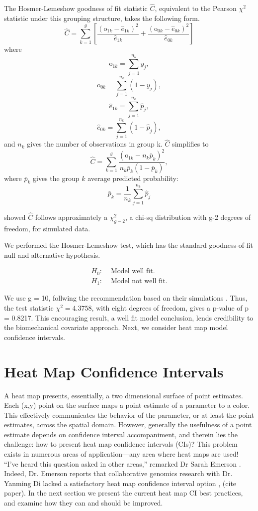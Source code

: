 The Hosmer-Lemeshow goodness of fit statistic $\hat{C}$, equivalent to the Pearson $\chi^{2}$ statistic under this grouping structure, takes the following form.
$$ \widehat{C} = \sum_{k=1}^{g} \left[ \frac{(\text{o}_{1k}-\hat{e}_{1k})^{2}}{\hat{e}_{1k}} + \frac{(\text{o}_{0k}-\hat{e}_{0k})^{2}}{\hat{e}_{0k}}  \right] $$
where
$$ \text{o}_{1k} =  \sum_{j=1}^{n_{k}}y_{j},$$
$$ \text{o}_{0k} =  \sum_{j=1}^{n_{k}}(1-y_{j}),$$
$$ \hat{e}_{1k} = \sum_{j=1}^{n_{k}}\hat{p}_{j},$$
$$ \hat{e}_{0k} = \sum_{j=1}^{n_{k}}(1-\hat{p}_{j}),$$
and $n_{k}$ gives the number of observations in group k. $\widehat{C}$ simplifies to
$$ \widehat{C} = \sum_{k=1}^{g} \frac{(\text{o}_{1k}-n_{k}\bar{p}_{k})^{2}}{n_{k}\bar{p}_{k}(1-\bar{p}_{k})},$$
where $\bar{p}_{k}$ gives the group $k$ average predicted probability:
$$\bar{p}_{k} = \frac{1}{n_{k}}\sum_{j=1}^{n_{k}}\hat{p}_{j}$$

\cite{Hosmer1980} showed $\widehat{C}$ follows approximately a $\chi^{2}_{g-2}$, a chi-sq distribution with g-2 degrees of freedom, for simulated data. 

We performed the Hosmer-Lemeshow test, which has the standard goodness-of-fit null and alternative hypothesis.

\begin{align}
H_{0}: & \text{ Model well fit.} \\
H_{1}: & \text{ Model not well fit.}
\end{align}

We use g = 10, follwing the \cite{Hosmer2013} recommendation based on their simulations \cite{Hosmer1980}. Thus, the test statistic $\chi^{2} = 4.3758$, with eight degrees of freedom, gives a p-value of p = 0.8217. This encouraging result, a well fit model conclusion, lends credibility to the biomechanical covariate approach. Next, we consider heat map model confidence intervals.

\section{Heat Map Confidence Intervals}

A heat map presents, essentially, a two dimensional surface of point estimates. Each (x,y) point on the surface maps a point estimate of a parameter to a color. This effectively communicates the behavior of the parameter, or at least the point estimates, across the spatial domain. However, generally the usefulness of a point estimate depends on confidence interval accompaniment, and therein lies the challenge: how to present heat map confidence intervals (CIs)? This problem exists in numerous areas of application---any area where heat maps are used! ``I've heard this question asked in other areas,'' remarked Dr Sarah Emerson \citep{Emerson}. Indeed, Dr. Emerson reports that collaborative genomics research with Dr. Yanming Di lacked a satisfactory heat map confidence interval option \citep{Emerson}, (cite paper). In the next section we present the current heat map CI best practices, and examine how they can and should be improved.

